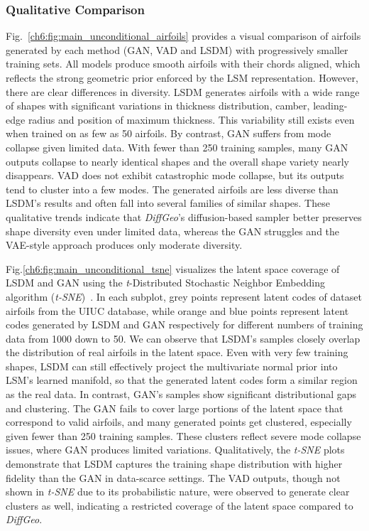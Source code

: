 \subsubsection{Qualitative Comparison}

Fig.~\ref{ch6:fig:main_unconditional_airfoils} provides a visual comparison of airfoils generated by each method (GAN, VAD and LSDM) with progressively smaller training sets. All models produce smooth airfoils with their chords aligned, which reflects the strong geometric prior enforced by the LSM representation. However, there are clear differences in diversity. LSDM generates airfoils with a wide range of shapes with significant variations in thickness distribution, camber, leading-edge radius and position of maximum thickness. This variability still exists even when trained on as few as 50 airfoils. By contrast, GAN suffers from mode collapse given limited data. With fewer than 250 training samples, many GAN outputs collapse to nearly identical shapes and the overall shape variety nearly disappears. VAD does not exhibit catastrophic mode collapse, but its outputs tend to cluster into a few modes. The generated airfoils are less diverse than LSDM’s results and often fall into several families of similar shapes. These qualitative trends indicate that \textit{DiffGeo}’s diffusion-based sampler better preserves shape diversity even under limited data, whereas the GAN struggles and the VAE-style approach produces only moderate diversity.

Fig.\ref{ch6:fig:main_unconditional_tsne} visualizes the latent space coverage of LSDM and GAN using the \textit{t}-Distributed Stochastic Neighbor Embedding algorithm (\textit{t-SNE})~\cite{ai.Maaten2008}. In each subplot, grey points represent latent codes of dataset airfoils from the UIUC database, while orange and blue points represent latent codes generated by LSDM and GAN respectively for different numbers of training data from 1000 down to 50. We can observe that LSDM’s samples closely overlap the distribution of real airfoils in the latent space. Even with very few training shapes, LSDM can still effectively project the multivariate normal prior into LSM's learned manifold, so that the generated latent codes form a similar region as the real data. In contrast, GAN’s samples show significant distributional gaps and clustering. The GAN fails to cover large portions of the latent space that correspond to valid airfoils, and many generated points get clustered, especially given fewer than 250 training samples. These clusters reflect severe mode collapse issues, where GAN produces limited variations. Qualitatively, the \textit{t-SNE} plots demonstrate that LSDM captures the training shape distribution with higher fidelity than the GAN in data-scarce settings. The VAD outputs, though not shown in \textit{t-SNE} due to its probabilistic nature, were observed to generate clear clusters as well, indicating a restricted coverage of the latent space compared to \textit{DiffGeo}.

